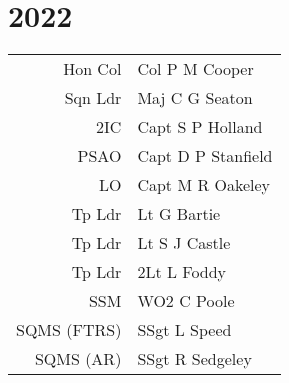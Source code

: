 \chapter*{2022}

\vspace*{10mm}

\begin{center}
  \small
  \begin{tabular}{rl}
    Hon Col & Col P M Cooper \\
    Sqn Ldr & Maj C G Seaton \\
    2IC & Capt S P Holland \\
    PSAO & Capt D P Stanfield \\
    LO & Capt M R Oakeley \\
    Tp Ldr & Lt G Bartie \\
    Tp Ldr & Lt S J Castle \\
    Tp Ldr & 2Lt L Foddy \\
    SSM & WO2 C Poole \\
    SQMS (FTRS) & SSgt L Speed \\
    SQMS (AR) & SSgt R Sedgeley \\
  \end{tabular}
\end{center}

\vspace*{10mm}

